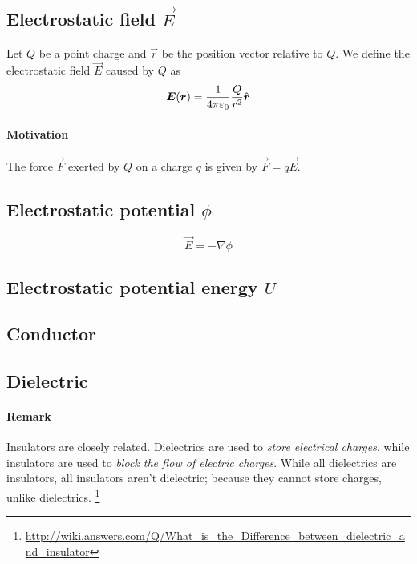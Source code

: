 \subsection{Electrostatic field $\vec{E}$}

Let $Q$ be a point charge and $\vec{r}$ be the position vector
relative to $Q$. We define the electrostatic field $\vec{E}$ caused by
$Q$ as
\begin{equation*}
  \boldsymbol{E}(\boldsymbol{r}) = \frac{1}{4\pi\varepsilon_0}\frac{Q}{r^2}\hat{\boldsymbol{r}}
\end{equation*}

\paragraph{Motivation} The force $\vec{F}$ exerted by $Q$ on a charge $q$ is
given by $\vec{F} = q\vec{E}$.

\subsection{Electrostatic potential $\phi$}
\label{def:potential}
\begin{equation*}
  \vec{E} = - \nabla\phi
\end{equation*}

\subsection{Electrostatic potential energy $U$}

\subsection{Conductor}

\subsection{Dielectric}

\paragraph{Remark} Insulators are closely related. Dielectrics are
used to \emph{store electrical charges}, while insulators are used to
\emph{block the flow of electric charges}. While all dielectrics are
insulators, all insulators aren't dielectric; because they cannot
store charges, unlike dielectrics.
\footnote{\url{http://wiki.answers.com/Q/What_is_the_Difference_between_dielectric_and_insulator}}





